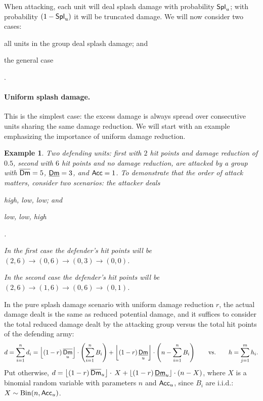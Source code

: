 \documentclass{article}
\newcommand{\floor}[1]{\left\lfloor #1 \right\rfloor}
\newcommand{\Binomial}{\mathrm{Bin}}
\DeclareMathOperator{\DLow}{\underline{\sf Dm}} %
\DeclareMathOperator{\DHigh}{\overline{\sf Dm}} %
\DeclareMathOperator{\Acc}{{\sf Acc}} %
\DeclareMathOperator{\Spl}{{\sf Spl}} %
\newtheorem{example}{Example}
\numberwithin{equation}{section}
\begin{document}
When attacking, each unit will deal splash damage with probability $\Spl _u$; with probability $(1 - \Spl _u)$ it will be truncated damage.
We will now consider two cases: \begin{inparaenum}[(i)]\item all units in the group deal splash damage; and \item the general case\end{inparaenum}.

\paragraph*{Uniform splash damage.}

This is the simplest case: the excess damage is always spread over consecutive units sharing the same damage reduction.
We will start with an example emphasizing the importance of uniform damage reduction.
\begin{example}
    Two defending units: first with $2$ hit points and damage reduction of $0.5$, second with $6$ hit points and no damage reduction, are attacked by a group with $\DHigh = 5$, $\DLow = 3$, and $\Acc = 1$. To demonstrate that the order of attack matters, consider two scenarios: the attacker deals \begin{inparaenum}[(i)]\item high, low, low; and \item low, low, high \end{inparaenum}.

    In the first case the defender's hit points will be $(2, 6) \to (0, 6) \to (0, 3) \to (0, 0)$.

    In the second case the defender's hit points will be $(2, 6) \to (1, 6) \to (0, 6) \to (0, 1)$.
\end{example}


In the pure splash damage scenario with uniform damage reduction $r$, the actual damage dealt is the same as reduced potential damage, and it suffices to consider the total reduced damage dealt by the attacking group versus the total hit points of the defending army:
\begin{align*}
    d = \sum _{i = 1} ^{n} d_i = \floor{(1 - r) \DHigh _u} \cdot \left( \sum _{i = 1} ^{n} B_i \right) + \floor{(1 - r) \DLow _u} \cdot \left( n - \sum _{i = 1} ^{n} B_i \right)
    \qquad \text{vs.} \qquad
    h = \sum _{j = 1} ^{m} h_i.
\end{align*}
Put otherwise, $d = \floor{(1 - r) \DHigh _u} \cdot \, X + \floor{(1 - r) \DLow _u} \cdot \left( n - X \right)$, where $X$ is a binomial random variable with parameters $n$ and $\Acc _{u}$, since $B_i$ are i.i.d.: $X \sim \Binomial(n, \Acc _{u})$.
\end{document}
